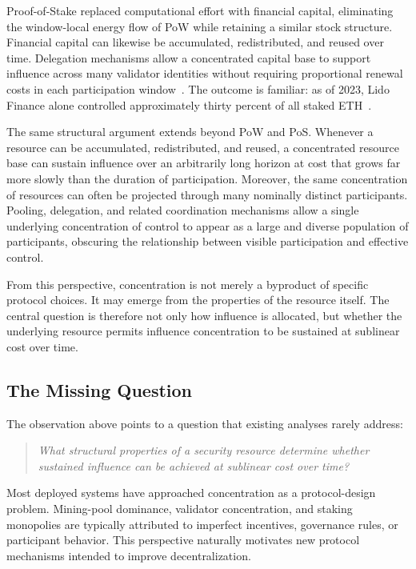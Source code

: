 \documentclass[manuscript,review]{acmart}
\theoremstyle{remark}
\begin{document}
	Proof-of-Stake replaced computational effort with
	financial capital, eliminating the window-local energy
	flow of PoW while retaining a similar stock structure.
	Financial capital can likewise be accumulated,
	redistributed, and reused over time.
	Delegation mechanisms allow a concentrated capital base to
	support influence across many validator identities without
	requiring proportional renewal costs in each participation
	window~\cite{kiayias2017ouroboros,saleh2021blockchain}.
	The outcome is familiar: as of 2023, Lido Finance alone
	controlled approximately thirty percent of all staked
	ETH~\cite{lido2023concentration}.
	
	The same structural argument extends beyond PoW and PoS.
	Whenever a resource can be accumulated, redistributed, and
	reused, a concentrated resource base can sustain influence
	over an arbitrarily long horizon at cost that grows far
	more slowly than the duration of participation.
	Moreover, the same concentration of resources can often be
	projected through many nominally distinct participants.
	Pooling, delegation, and related coordination mechanisms
	allow a single underlying concentration of control to
	appear as a large and diverse population of participants,
	obscuring the relationship between visible participation
	and effective control.
	
	From this perspective, concentration is not merely a
	byproduct of specific protocol choices. It may emerge from
	the properties of the resource itself. The central question
	is therefore not only how influence is allocated, but
	whether the underlying resource permits influence
	concentration to be sustained at sublinear cost over time.
	
	
	
	
	\subsection{The Missing Question}
	\label{ssec:missing}
	
	The observation above points to a question that existing
	analyses rarely address:
	
	\begin{quote}
		\emph{What structural properties of a security resource
			determine whether sustained influence can be achieved at
			sublinear cost over time?}
	\end{quote}
	
	Most deployed systems have approached concentration as a
	protocol-design problem. Mining-pool dominance, validator
	concentration, and staking monopolies are typically
	attributed to imperfect incentives, governance rules, or
	participant behavior. This perspective naturally motivates
	new protocol mechanisms intended to improve decentralization.
	
\end{document}

